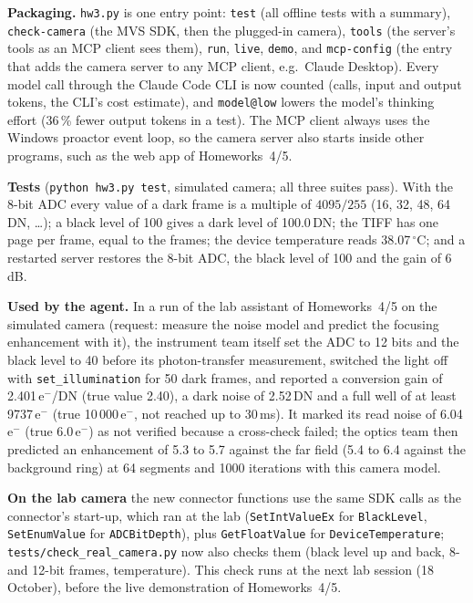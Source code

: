 \textbf{Packaging.} \texttt{hw3.py} is one entry point: \texttt{test} (all offline tests with a summary),
\texttt{check-camera} (the MVS SDK, then the plugged-in camera), \texttt{tools} (the server's tools as an MCP client sees
them), \texttt{run}, \texttt{live}, \texttt{demo}, and \texttt{mcp-config} (the entry that adds the camera server to any
MCP client, e.g.\ Claude Desktop). Every model call through the Claude Code CLI is now counted (calls, input and output
tokens, the CLI's cost estimate), and \texttt{model@low} lowers the model's thinking effort (36\,\% fewer output
tokens in a test). The MCP client always uses the Windows proactor event loop, so the camera server also starts inside
other programs, such as the web app of Homeworks~4/5.

\textbf{Tests} (\texttt{python hw3.py test}, simulated camera; all three suites pass). With the 8-bit ADC every value of a
dark frame is a multiple of $4095/255$ (16, 32, 48, 64\,DN, \dots); a black level of 100 gives a dark level of
100.0\,DN; the TIFF has one page per frame, equal to the frames; the device temperature reads 38.07\,$^\circ$C; and a
restarted server restores the 8-bit ADC, the black level of 100 and the gain of 6\,dB.

\textbf{Used by the agent.} In a run of the lab assistant of Homeworks~4/5 on the simulated camera (request: measure the
noise model and predict the focusing enhancement with it), the instrument team itself set the ADC to 12 bits and the
black level to 40 before its photon-transfer measurement, switched the light off with \texttt{set\_illumination} for 50
dark frames, and reported a conversion gain of 2.401\,e$^-$/DN (true value 2.40), a dark noise of 2.52\,DN and a full well
of at least 9737\,e$^-$ (true 10\,000\,e$^-$, not reached up to 30\,ms). It marked its read noise of 6.04\,e$^-$ (true
6.0\,e$^-$) as not verified because a cross-check failed; the optics team then predicted an enhancement of 5.3 to
5.7 against the far field (5.4 to 6.4 against the background ring) at 64 segments and 1000 iterations with this camera
model.

\textbf{On the lab camera} the new connector functions use the same SDK calls as the connector's start-up, which ran at
the lab (\texttt{SetIntValueEx} for \texttt{BlackLevel}, \texttt{SetEnumValue} for \texttt{ADCBitDepth}), plus
\texttt{GetFloatValue} for \texttt{DeviceTemperature}; \texttt{tests/check\_real\_camera.py} now also checks them (black
level up and back, 8- and 12-bit frames, temperature). This check runs at the next lab session (18 October), before the
live demonstration of Homeworks~4/5.
